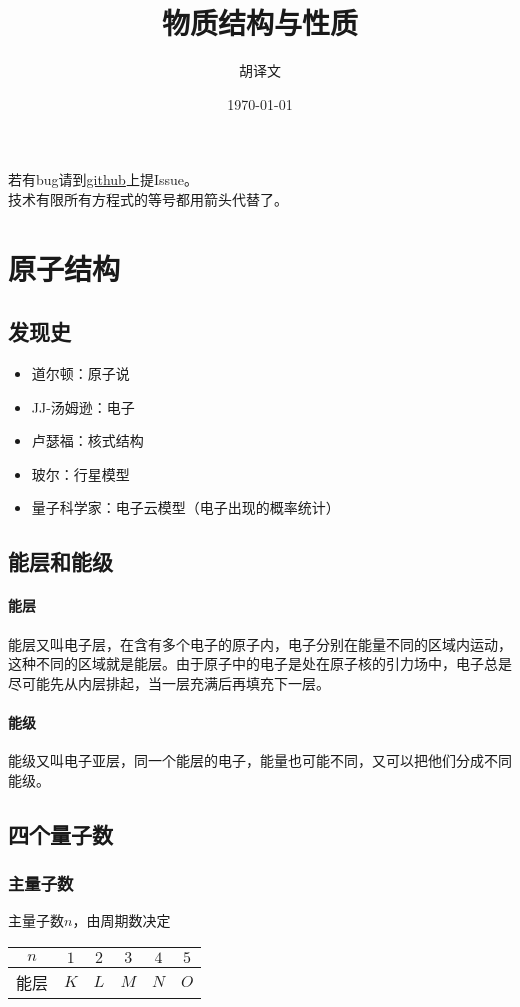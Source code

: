 \documentclass[a4paper]{article}
\title{物质结构与性质}
\author{胡译文}
\date{\today}
\renewcommand\contentsname{目录}
\begin{document}
	\maketitle
	\begin{center}
		若有bug请到{\color{red}\href{https://github.com/huyiwen/Chem}{github}}上提Issue。\\
		技术有限所有方程式的等号都用箭头代替了。
	\end{center}
	\renewcommand\contentsname{目录}
	\tableofcontents
	
	
	\clearpage
	\section{原子结构}
	
	
	\subsection{发现史}
	\begin{itemize}
		\item 道尔顿：原子说
		\item JJ-汤姆逊：电子
		\item 卢瑟福：核式结构
		\item 玻尔：行星模型
		\item 量子科学家：电子云模型（电子出现的概率统计）
	\end{itemize}
	
	
	\subsection{能层和能级}
	\paragraph{能层}
	能层又叫电子层，在含有多个电子的原子内，电子分别在能量不同的区域内运动，这种不同的区域就是能层。由于原子中的电子是处在原子核的引力场中，电子总是尽可能先从内层排起，当一层充满后再填充下一层。
	\paragraph{能级}
	能级又叫电子亚层，同一个能层的电子，能量也可能不同，又可以把他们分成不同能级。
	
	\subsection{四个量子数}	
	\subsubsection{主量子数}
	主量子数$n$，由周期数决定
	\renewcommand\arraystretch{2}
	\begin{center}
	\begin{tabular}{|c|c|c|c|c|c|}
		\hline
		$n$ & $1$ & $2$ & $3$ & $4$ & $5$\\\hline
		能层 & $K$ & $L$ & $M$ & $N$ & $O$\\\hline
	\end{tabular}
	\end{center}
\end{document}

